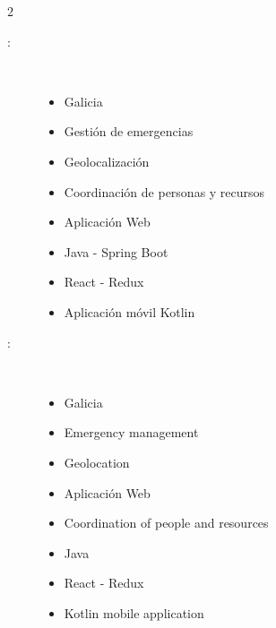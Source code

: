 \begin{multicols}{2}
\begin{description}
\item [\palabraschaveprincipal:] \mbox{} \\[-20pt]
  \begin{itemize}
    \item Galicia
    \item Gestión de emergencias
    \item Geolocalización
    \item Coordinación de personas y recursos
    \item Aplicación Web
    \item Java - Spring Boot
    \item React - Redux
    \item Aplicación móvil Kotlin
  \end{itemize}
\end{description}

\begin{description}
\item [\palabraschavesecundaria:] \mbox{} \\[-20pt]
  \begin{itemize}
    \item Galicia
    \item Emergency management
    \item Geolocation
    \item Aplicación Web
    \item Coordination of people and resources
    \item Java
    \item React - Redux
    \item Kotlin mobile application
  \end{itemize}
\end{description}
\end{multicols}
